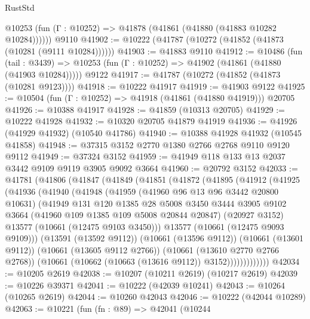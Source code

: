 \begin{lexlean}{RustStd}
\begin{coremodule}
      @10253 (fun (Γ : @10252) => @41878 (@41861 (@41880 (@41883 @10282 @10284))))))
    @9110
@41902 := @10222 (@41787 (@10272 (@41852 (@41873 (@10281 (@9111 @10284))))))
@41903 := @41883 @9110
@41912 := @10486
    (fun (tail : @3439) => @10253 (fun (Γ : @10252) => @41902 (@41861 (@41880 (@41903 @10284)))))
    @9122
@41917 := @41787 (@10272 (@41852 (@41873 (@10281 @9123))))
@41918 := @10222 @41917
@41919 := @41903 @9122
@41925 := @10504 (fun (Γ : @10252) => @41918 (@41861 (@41880 @41919))) @20705
@41926 := @10388 @41917
@41928 := @41859 (@10313 @20705)
@41929 := @10222 @41928
@41932 := @10320 @20705 @41879 @41919
@41936 := @41926 (@41929 @41932) (@10540 @41786)
@41940 := @10388 @41928 @41932 (@10545 @41858)
@41948 := @37315 @3152 @2770 @1380 @2766 @2768 @9110 @9120 @9112
@41949 := @37324 @3152
@41959 := @41949 @118 @133 @13 @2037 @3442 @9109 @9119 @3905 @9092 @3664
@41960 := @20792 @3152
@42033 := @41781
    (@41806
      (@41847
        (@41849
          (@41851
            (@41872
              (@41895
                (@41912
                  (@41925
                    (@41936
                      (@41940
                        (@41948
                          (@41959
                            (@41960 @96 @13 @96 @3442 @20800 @10631)
                            (@41949
                              @131
                              @120
                              @1385
                              @28
                              @5008
                              @3450
                              @3444
                              @3905
                              @9102
                              @3664
                              (@41960 @109 @1385 @109 @5008 @20844 @20847)
                              (@20927 @3152)
                              @13577
                              (@10661 (@12475 @9103 @3450)))
                            @13577
                            (@10661 (@12475 @9093 @9109)))
                          (@13591 (@13592 @9112))
                          (@10661 (@13596 @9112))
                          (@10661 (@13601 @9112))
                          (@10661 (@13605 @9112 @2766))
                          (@10661 (@13610 @2770 @2766 @2768))
                          (@10661 (@10662 (@10663 (@13616 @9112)) @3152)))))))))))))
@42034 := @10205 @2619
@42038 := @10207 (@10211 @2619) (@10217 @2619)
@42039 := @10226 @39371
@42041 := @10222 (@42039 @10241)
@42043 := @10264 (@10265 @2619)
@42044 := @10260 @42043
@42046 := @10222 (@42044 @10289)
@42063 := @10221
    (fun (fn : @89) =>
    @42041
      (@10244

\end{coremodule}
\end{lexlean}

